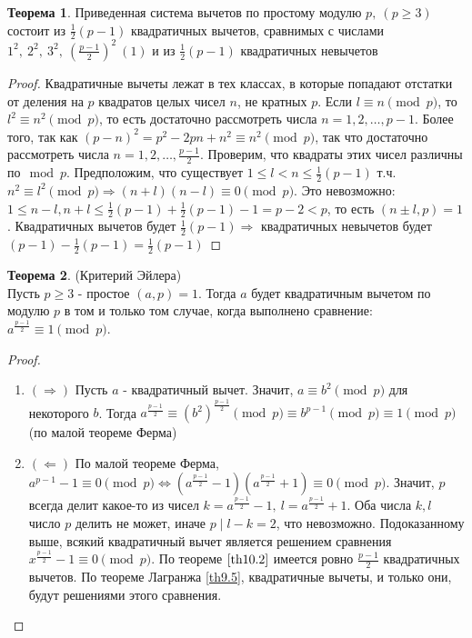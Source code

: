 \documentclass[a4paper, 12pt]{article}
\renewcommand{\div}{\mid}
\newcommand\tab[1][.5cm]{\hspace*{#1}}
\theoremstyle{definition}
\newtheorem{theorem}{Теорема}[section]
\begin{document}
    \begin{theorem} \label{th10.2}
        Приведенная система вычетов по простому модулю $p,\ (p\geq 3)$ состоит из $\frac{1}{2}(p-1)$ квадратичных вычетов, сравнимых с числами\\
        $1^2,\ 2^2,\ 3^2,\ (\frac{p-1}{2})^2\ (1)$ и из $\frac{1}{2}(p-1)$ квадратичных невычетов
    \end{theorem} 
    \begin{proof}
        Квадратичные вычеты лежат в тех классах, в которые попадают отстатки от деления на $p$ квадратов целых чисел $n$, не кратных $p$. Если $l\equiv n\pmod{p}$, то $l^2\equiv n^2\pmod{p}$, то есть достаточно рассмотреть числа $n=1,2,\dots,p-1$. Более того, так как $(p-n)^2=p^2-2pn+n^2\equiv n^2\pmod{p}$, так что достаточно рассмотреть числа $n=1,2,\dots,\frac{p-1}{2}$. Проверим, что квадраты этих чисел различны по$\mod{p}$. Предположим, что существует $1\leq l<n\leq\frac{1}{2}(p-1)$ т.ч. $n^2\equiv l^2\pmod{p} \Rightarrow (n+l)(n-l)\equiv 0\pmod{p}$. Это невозможно: $1\leq n-l, n+l\leq \frac{1}{2}(p-1)+\frac{1}{2}(p-1)-1=p-2<p$, то есть $(n\pm l, p)=1$. Квадратичных вычетов будет $\frac{1}{2}(p-1) \Rightarrow$ квадратичных невычетов будет $(p-1)-\frac{1}{2}(p-1)=\frac{1}{2}(p-1)$
    \end{proof} 
    \begin{theorem} (Критерий Эйлера) \label{th10.3} \\
        Пусть $p\geq 3$ - простое $(a,p)=1$. Тогда $a$ будет квадратичным вычетом по модулю $p$ в том и только том случае, когда выполнено сравнение:\\
        $a^{\frac{p-1}{2}}\equiv 1\pmod{p}$.
    \end{theorem} 
    \begin{proof}\tab
        \begin{enumerate}
            \item $(\Rightarrow)$ Пусть $a$ - квадратичный вычет. Значит, $a\equiv b^2\pmod{p}$ для некоторого $b$. Тогда $a^{\frac{p-1}{2}}\equiv (b^2)^{\frac{p-1}{2}}\pmod{p}\equiv b^{p-1}\pmod{p}\equiv 1 \pmod{p}$ (по малой теореме Ферма)
            \item $(\Leftarrow)$ По малой теореме Ферма, $a^{p-1}-1\equiv 0\pmod{p}\Leftrightarrow (a^{\frac{p-1}{2}}-1)(a^{\frac{p-1}{2}}+1)\equiv 0\pmod{p}$. Значит, $p$ всегда делит какое-то из чисел $k=a^{\frac{p-1}{2}}-1,\ l=a^{\frac{p-1}{2}}+1$. Оба числа $k,l$ число $p$ делить не может, иначе $p\div l-k=2$, что невозможно. Подоказанному выше, всякий квадратичный вычет является решением сравнения $x^{\frac{p-1}{2}}-1\equiv 0\pmod{p}$. По теореме $\ref{th10.2}$ имеется ровно $\frac{p-1}{2}$ квадратичных вычетов. По теореме Лагранжа \eqref{th9.5}, квадратичные вычеты, и только они, будут решениями этого сравнения.
        \end{enumerate}
    \end{proof} 
\end{document}
